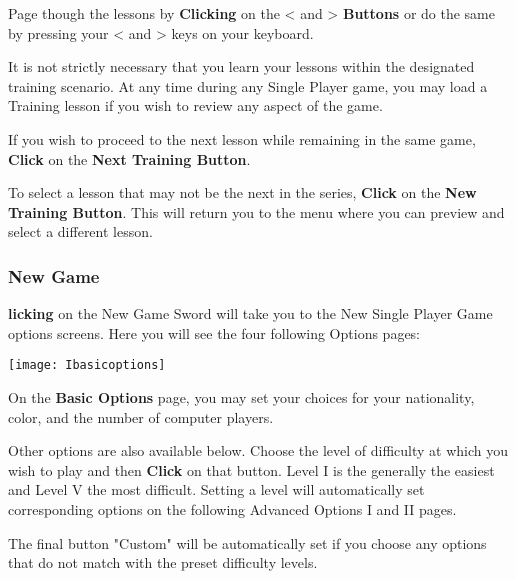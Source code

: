 
Page though the lessons by \textbf{Clicking} on the \textless \hspace{1pt} and \textgreater \hspace{1pt} \textbf{Buttons} or do the same by pressing your \textless \hspace{1pt} and \textgreater \hspace{1pt} keys on your keyboard.

It is not strictly necessary that you learn your lessons within the designated training scenario. At any time during any Single Player game, you may load a Training lesson if you wish to review any aspect of the game.

If you wish to proceed to the next lesson while remaining in the same game, \textbf{Click} on the \textbf{Next Training Button}.

To select a lesson that may not be the next in the series, \textbf{Click} on the \textbf{New Training Button}. This will return you to the menu where you can preview and select a different lesson.

\subsubsection{\textsf{New Game}}


\textbf{licking} on the New Game Sword will take you to the New Single Player Game options screens. Here you will see the four following Options pages:

\begin{center}
    \texttt{[image: Ibasicoptions]} %
\end{center}

On the \textbf{Basic Options} page, you may set your choices for your nationality, color, and the number of computer players.


Other options are also available below. Choose the level of difficulty at which you wish to play and then \textbf{Click} on that button. Level I is the generally the easiest and Level V the most difficult. Setting a level will automatically set corresponding options on the following Advanced Options I and II pages.


The final button "Custom" will be automatically set if you choose any options that do not match with the preset difficulty levels.

